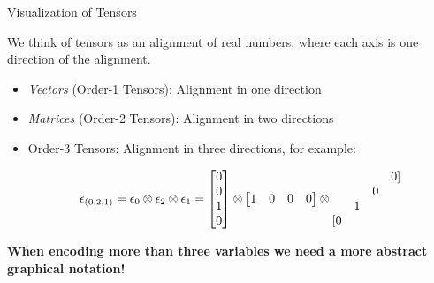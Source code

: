 \documentclass{beamer}
\begin{document}
    \begin{frame}{Visualization of Tensors}

        We think of tensors as an alignment of real numbers, where each axis is one direction of the alignment.
        \begin{itemize}
            \item \emph{Vectors} (Order-1 Tensors): Alignment in one direction
            \item \emph{Matrices} (Order-2 Tensors): Alignment in two directions
            \item Order-3 Tensors: Alignment in three directions, for example:

            \begin{align*}
                \epsilon_{(0,2,1)}
                = \epsilon_{0} \otimes \epsilon_{2} \otimes \epsilon_{1}=
                \begin{bmatrix}
                    0 \\ 0 \\ 1 \\ 0
                \end{bmatrix}
                \otimes
                \begin{bmatrix}
                    1 & 0 & 0 & 0
                \end{bmatrix}
                \otimes
                \begin{matrix}
                    & & & 0 ] \\
                    & & 0 & \\
                    & 1 & & \\
                    [0 & & &
                \end{matrix}
            \end{align*}
        \end{itemize}

        \begin{center}
            \bf When encoding more than three variables we need a more abstract graphical notation!
        \end{center}

    \end{frame}
\end{document}
